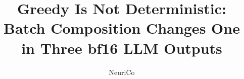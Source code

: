 \documentclass{article}
\title{Greedy Is Not Deterministic: Batch Composition Changes One in Three bf16 LLM Outputs}
\author{NeuriCo}
\begin{document}
\maketitle

\begin{abstract}

\end{abstract}










\appendix

\end{document}
